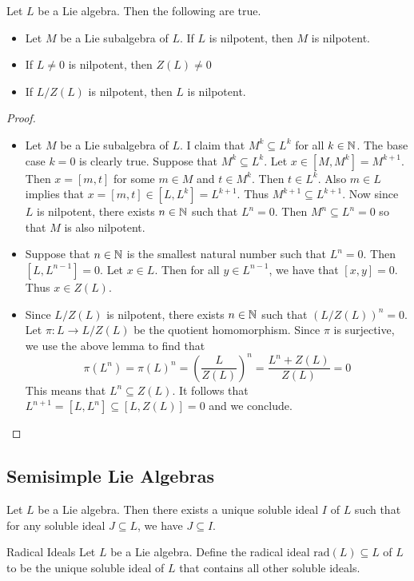 \documentclass[a4paper]{article}
\begin{document}
\begin{lmm}{}{} Let $L$ be a Lie algebra. Then the following are true. 
\begin{itemize}
\item Let $M$ be a Lie subalgebra of $L$. If $L$ is nilpotent, then $M$ is nilpotent. 
\item If $L\neq 0$ is nilpotent, then $Z(L)\neq 0$
\item If $L/Z(L)$ is nilpotent, then $L$ is nilpotent. 
\end{itemize} \tcbline
\begin{proof}~\\
\begin{itemize}
\item Let $M$ be a Lie subalgebra of $L$. I claim that $M^k\subseteq L^k$ for all $k\in\mathbb{N}$. The base case $k=0$ is clearly true. Suppose that $M^k\subseteq L^k$. Let $x\in[M,M^k]=M^{k+1}$. Then $x=[m,t]$ for some $m\in M$ and $t\in M^k$. Then $t\in L^k$. Also $m\in L$ implies that $x=[m,t]\in[L,L^k]=L^{k+1}$. Thus $M^{k+1}\subseteq L^{k+1}$. Now since $L$ is nilpotent, there exists $n\in\mathbb{N}$ such that $L^n=0$. Then $M^n\subseteq L^n=0$ so that $M$ is also nilpotent. 
\item Suppose that $n\in\mathbb{N}$ is the smallest natural number such that $L^n=0$. Then $[L,L^{n-1}]=0$. Let $x\in L$. Then for all $y\in L^{n-1}$, we have that $[x,y]=0$. Thus $x\in Z(L)$. 
\item Since $L/Z(L)$ is nilpotent, there exists $n\in\mathbb{N}$ such that $(L/Z(L))^n=0$. Let $\pi:L\to L/Z(L)$ be the quotient homomorphism. Since $\pi$ is surjective, we use the above lemma to find that $$\pi(L^n)=\pi(L)^n=\left(\frac{L}{Z(L)}\right)^n=\frac{L^n+Z(L)}{Z(L)}=0$$ This means that $L^n\subseteq Z(L)$. It follows that $L^{n+1}=[L,L^n]\subseteq[L,Z(L)]=0$ and we conclude. 
\end{itemize}
\end{proof}
\end{lmm}

\subsection{Semisimple Lie Algebras}
\begin{prp}{}{} Let $L$ be a Lie algebra. Then there exists a unique soluble ideal $I$ of $L$ such that for any soluble ideal $J\subseteq L$, we have $J\subseteq I$. 
\end{prp}

\begin{defn}{Radical Ideals}{} Let $L$ be a Lie algebra. Define the radical ideal $\text{rad}(L)\subseteq L$ of $L$ to be the unique soluble ideal of $L$ that contains all other soluble ideals. 
\end{defn}
\end{document}
